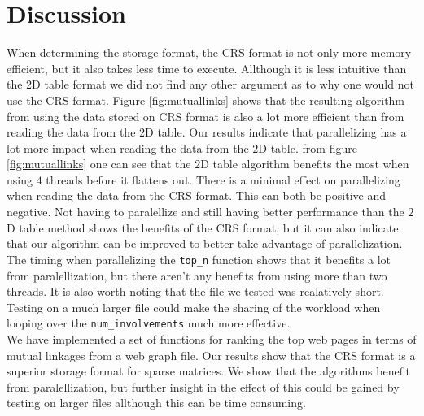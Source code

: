 \documentclass[onecolumn]{aastex62}
\begin{document}
\section{Discussion}
When determining the storage format, the CRS format is not only more memory efficient, but it also takes less time to execute. Allthough it is less intuitive than the 2D table format we did not find any other argument as to why one would not use the CRS format. Figure \ref{fig:mutuallinks} shows that the resulting algorithm from using the data stored on CRS format is also a lot more efficient than from reading the data from the $2$D table. Our results indicate that parallelizing has a lot more impact when reading the data from the $2$D table. from figure \ref{fig:mutuallinks} one can see that the $2$D table algorithm benefits the most when using $4$ threads before it flattens out. There is a minimal effect on parallelizing when reading the data from the CRS format. This can both be positive and negative. Not having to paralellize and still having better performance than the $2$D table method shows the benefits of the CRS format, but it can also indicate that our algorithm can be improved to better take advantage of parallelization. The timing when parallelizing the \texttt{top\_n} function shows that it benefits a lot from paralellization, but there aren't any benefits from using more than two threads. It is also worth noting that the file we tested was realatively short. Testing on a much larger file could make the sharing of the workload when looping over the \texttt{num\_involvements} much more effective.\\

We have implemented a set of functions for ranking the top web pages in terms of mutual linkages from a web graph file. Our results show that the CRS format is a superior storage format for sparse matrices. We show that the algorithms benefit from paralellization, but further insight in the effect of this could be gained by testing on larger files allthough this can be time consuming.


\end{document}
